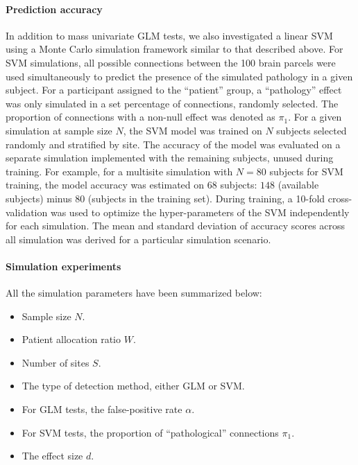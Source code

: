 \documentclass[authoryear]{elsarticle}
\begin{document}

\paragraph{Prediction accuracy}
In addition to mass univariate GLM tests, we also investigated a linear SVM \citep{Cortes1995} using a Monte Carlo simulation framework similar to that described above. For SVM simulations, all possible connections between the 100 brain parcels were used simultaneously to predict the presence of the simulated pathology in a given subject. For a participant assigned to the ``patient'' group, a ``pathology'' effect was only simulated in a set percentage of connections, randomly selected. The proportion of connections with a non-null effect was denoted as $\pi_1$. For a given simulation at sample size $N$, the SVM model was trained on $N$ subjects selected randomly and stratified by site. The accuracy of the model was evaluated on a separate simulation implemented with the remaining subjects, unused during training. For example, for a multisite simulation with $N=80$ subjects for SVM training, the model accuracy was estimated on $68$ subjects: $148$ (available subjects) minus $80$ (subjects in the training set). During training, a 10-fold cross-validation was used to optimize the hyper-parameters of the SVM independently for each simulation. The mean and standard deviation of accuracy scores across all simulation was derived for a particular simulation scenario.

\paragraph{Simulation experiments}

All the simulation parameters have been summarized below: 
\begin{itemize}
 \item Sample size $N$. 
 \item Patient allocation ratio $W$. 
 \item Number of sites $S$. 
 \item The type of detection method, either GLM or SVM. 
 \item For GLM tests, the false-positive rate $\alpha$. 
 \item For SVM tests, the proportion of ``pathological'' connections $\pi_1$.
 \item The effect size $d$. 
\end{itemize}
\end{document}
